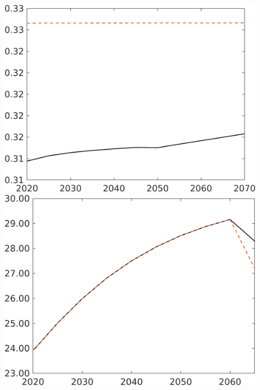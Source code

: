 \begin{figure}[h!!]
\begin{minipage}[]{0.32\textwidth}
\end{minipage}
	\begin{minipage}[]{0.32\textwidth}
	\includegraphics[width=1\textwidth]{../../codding_model/own_basedOnFried/optimalPol_190722_tidiedUp/figures/all_10Aout22/hl_TargetCompSP_T_regime3_spillover0_noskill0_sep1_xgrowth0_etaa0.79_lgd0.png}
\end{minipage}
	\begin{minipage}[]{0.32\textwidth}
	\includegraphics[width=1\textwidth]{../../codding_model/own_basedOnFried/optimalPol_190722_tidiedUp/figures/all_10Aout22/gAagg_TargetCompSP_T_regime3_spillover0_noskill0_sep1_xgrowth0_etaa0.79_lgd0.png}

\end{minipage}
\end{figure}
